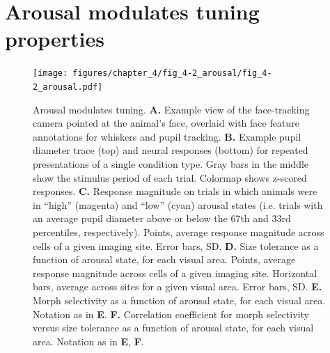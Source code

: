 \section{Arousal modulates tuning properties} 
\begin{figure}[t!]
    \texttt{[image: figures/chapter\_4/fig\_4-2\_arousal/fig\_4-2\_arousal.pdf]}
    \caption[Arousal modulates tuning]{Arousal modulates tuning. 
    \textbf{A.} Example view of the face-tracking camera pointed at the animal’s face, overlaid with face feature annotations for whiskers and pupil tracking.
    \textbf{B.} Example pupil diameter trace (top) and neural responses (bottom) for repeated presentations of a single condition type. Gray bars in the middle show the stimulus period of each trial. Colormap shows z-scored responses.
    \textbf{C.} Response magnitude on trials in which animals were in “high” (magenta) and “low” (cyan) arousal states (i.e. trials with an average pupil diameter above or below the 67th and 33rd percentiles, respectively). Points, average response magnitude across cells of a given imaging site. Error bars, SD.
    \textbf{D.} Size tolerance as a function of arousal state, for each visual area. Points, average response magnitude across cells of a given imaging site. Horizontal bars, average across sites for a given visual area. Error bars, SD.
    \textbf{E.} Morph selectivity as a function of arousal state, for each visual area. Notation as in \textbf{E}.
    \textbf{F.} Correlation coefficient for morph selectivity versus size tolerance as a function of arousal state, for each visual area. Notation as in \textbf{E}, \textbf{F}.
    \label{fig:arousal}}
\end{figure}

